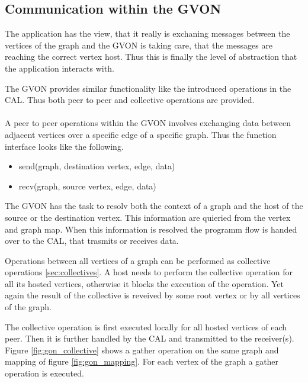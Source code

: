 \subsection{Communication within the GVON}
The application has the view, that it really is exchaning messages
between the vertices of the graph and the GVON is taking care, that
the messages are reaching the correct vertex host. Thus this is
finally the level of abstraction that the application interacts with.

The GVON provides similar functionality like the introduced operations
in the CAL. Thus both peer to peer and collective operations are
provided.


\paragraph*{}

A peer to peer operations within the GVON involves exchanging data
between adjacent vertices over a specific edge of a specific graph.
Thus the function interface looks like the following.

\begin{itemize}
  \item send(graph, destination vertex, edge, data)
  \item recv(graph, source vertex, edge, data)
\end{itemize}

The GVON has the task to resolv both the context of a graph and the
host of the source or the destination vertex. This information are
quieried from the vertex and graph map. When this information is
resolved the programm flow is handed over to the CAL, that trasmits or
receives data.

Operations between all vertices of a graph can be performed as
collective operations \ref{sec:collectives}. A host needs to
perform the collective operation for all its hosted vertices,
otherwise it blocks the execution of the operation. Yet again
the result of the collective is reveived by some root vertex
or by all vertices of the graph.

The collective operation is first executed locally for all hosted
vertices of each peer. Then it is further handled by the CAL and
transmitted to the receiver(s). Figure \ref{fig:gon_collective} shows
a gather operation on the same graph and mapping of figure
\ref{fig:gon_mapping}. For each vertex of the graph a gather operation
is executed.

